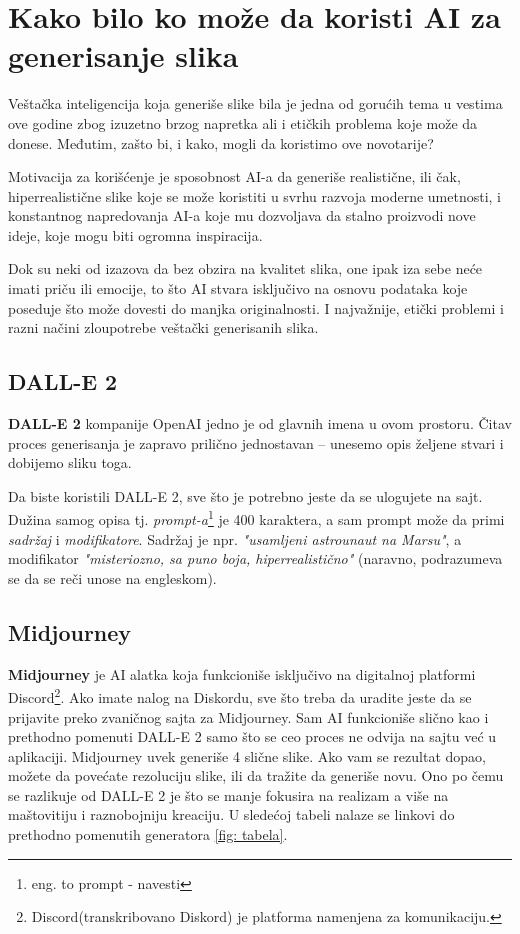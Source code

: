 \documentclass[12pt, letterpaper]{article}
\begin{document}
\section{Kako bilo ko može da koristi AI za generisanje slika}
Veštačka inteligencija koja generiše slike bila je jedna od gorućih tema u vestima ove godine zbog izuzetno brzog napretka ali i etičkih problema koje može da donese. Međutim, zašto bi, i kako, mogli da koristimo ove novotarije?

Motivacija za korišćenje je sposobnost AI-a da generiše realistične, ili čak, hiperrealistične slike koje se može koristiti u svrhu razvoja moderne umetnosti, i konstantnog napredovanja AI-a koje mu dozvoljava da stalno proizvodi nove ideje, koje mogu biti ogromna inspiracija.


Dok su neki od izazova da bez obzira na kvalitet slika, one ipak iza sebe neće imati priču ili emocije, to što AI stvara isključivo na osnovu podataka koje poseduje što može dovesti do manjka originalnosti. I najvažnije, etički problemi  i razni načini zloupotrebe veštački generisanih slika. 

\subsection{DALL-E 2}
\textbf{DALL-E 2} kompanije OpenAI jedno je od glavnih imena u ovom prostoru. Čitav proces generisanja je zapravo prilično jednostavan – unesemo opis željene stvari i dobijemo sliku toga.

Da biste koristili DALL-E 2, sve što je potrebno jeste da se ulogujete na sajt. Dužina samog opisa tj. \textit{prompt-a}\footnote{eng. to prompt - navesti} je 400 karaktera, a sam prompt može da primi \textit{sadržaj} i \textit{modifikatore}. Sadržaj je npr. \textit{"usamljeni astrounaut na Marsu"}, a modifikator \textit{"misteriozno, sa puno boja, hiperrealistično"} (naravno, podrazumeva se da se reči unose na engleskom). 

\subsection{Midjourney}
\textbf{Midjourney} je AI alatka koja funkcioniše isključivo na digitalnoj platformi Discord\footnote{Discord(transkribovano Diskord) je platforma namenjena za komunikaciju.}. Ako imate nalog na Diskordu, sve što treba da uradite jeste da se prijavite preko zvaničnog sajta za Midjourney. Sam  AI funkcioniše slično kao i prethodno pomenuti DALL-E 2 samo što se ceo proces ne odvija na sajtu već u aplikaciji. Midjourney uvek generiše 4 slične slike. Ako vam se rezultat dopao, možete da povećate rezoluciju slike, ili da tražite da generiše novu. Ono po čemu se razlikuje od DALL-E 2 je što se manje fokusira na realizam a više na maštovitiju i raznobojniju kreaciju. U sledećoj tabeli nalaze se linkovi do prethodno pomenutih generatora \ref{fig: tabela}.
\end{document}

